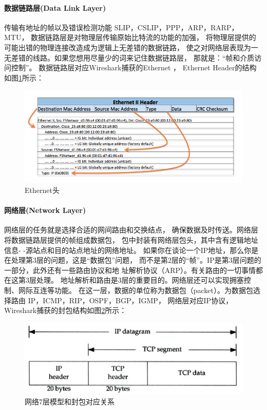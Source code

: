 \documentclass{book}
\begin{document}
\paragraph{数据链路层(Data Link Layer)}传输有地址的帧以及错误检测功能 SLIP，CSLIP，PPP，ARP，RARP，MTU，
数据链路层是对物理层传输原始比特流的功能的加强，
将物理层提供的可能出错的物理连接改造成为逻辑上无差错的数据链路，
使之对网络层表现为一无差错的线路。如果您想用尽量少的词来记住数据链路层，
那就是：“帧和介质访问控制”。
数据链路层对应Wireshark捕获的Ethernet \uppercase\expandafter{}，
Ethernet \uppercase\expandafter{} Header的结构如图\ref{fig:ethernetheader}所示：

\begin{figure}[htbp]
	\centering
	\includegraphics[scale=0.4]{ethernet-header.jpg}
	\caption{Ethernet头}
	\label{fig:ethernetheader}
\end{figure}

\paragraph{网络层(Network Layer)}网络层的任务就是选择合适的网间路由和交换结点，
确保数据及时传送。网络层将数据链路层提供的帧组成数据包，
包中封装有网络层包头，其中含有逻辑地址信息- -源站点和目的站点地址的网络地址。
如果你在谈论一个IP地址，那么你是在处理第3层的问题，这是“数据包”问题，
而不是第2层的“帧”。IP是第3层问题的一部分，此外还有一些路由协议和地 址解析协议（ARP）。有关路由的一切事情都在这第3层处理。
地址解析和路由是3层的重要目的。网络层还可以实现拥塞控制、网际互连等功能。
在这一层，数据的单位称为数据包（packet）。为数据包选择路由 IP，ICMP，RIP，OSPF，BGP，IGMP，
网络层对应IP协议，
Wireshark捕获的封包结构如图\ref{fig:IPDiagram}所示：

\begin{figure}[htbp]
	\centering
	\includegraphics[scale=0.6]{IPDiagram.jpg}
	\caption{网络7层模型和封包对应关系}
	\label{fig:IPDiagram}
\end{figure}
\end{document}
